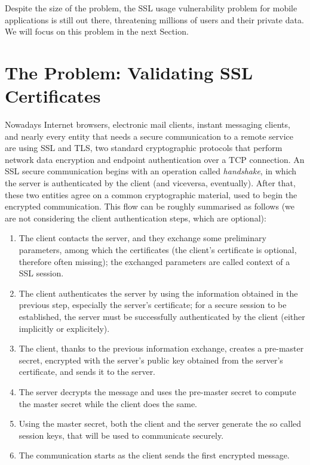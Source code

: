\documentclass[english]{llncs}
\begin{document}
Despite the size of the problem, the SSL usage vulnerability problem for mobile applications is still out there, threatening millions of users and their private data. We will focus on this problem in the next Section. 















\section{The Problem: Validating SSL Certificates}
\label{SSL Overview}

Nowadays Internet browsers, electronic mail clients, instant messaging clients, and nearly every entity that needs a secure communication to a remote service are using SSL and TLS, two standard cryptographic protocols that perform network data encryption and endpoint authentication over a TCP connection. An SSL secure communication begins with an operation called \textit{handshake}, in which the server is authenticated by the client (and viceversa, eventually). After that, these two entities agree on a common cryptographic material, used to begin the encrypted communication. This flow can be roughly summarised as follows (we are not considering the client authentication steps, which are optional):

\begin{enumerate}
	\item The client contacts the server, and they exchange some preliminary parameters, among which the certificates (the client's certificate is optional, therefore often missing); the exchanged parameters are called context of a SSL session.
	\item The client authenticates the server by using the information obtained in the previous step, especially the server's certificate; for a secure session to be established, the server must be successfully authenticated by the client (either implicitly or explicitely).
	\item The client, thanks to the previous information exchange, creates a pre-master secret, encrypted with the server's public key obtained from the server's certificate, and sends it to the server.
	\item The server decrypts the message and uses the pre-master secret to compute the master secret while the client does the same. 
	\item Using the master secret, both the client and the server generate the so called session keys, that will be used to communicate securely.
	\item The communication starts as the client sends the first encrypted message.
\end{enumerate}
\end{document}
